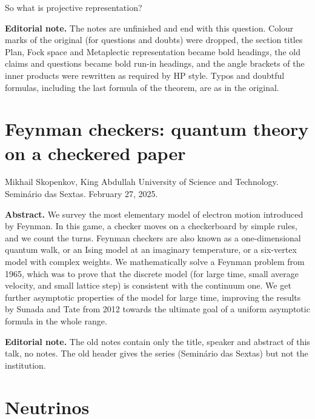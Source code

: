 \medskip{}
So what is projective representation?

\medskip\noindent
{\bf Editorial note.}
The notes are unfinished and end with this
question. Colour marks of the original
(for questions and doubts) were dropped,
the section titles Plan, Fock space and
Metaplectic representation became
bold headings, the old claims and
questions became bold run-in headings,
and the angle brackets of the inner
products were rewritten as required by
HP style. Typos and doubtful formulas,
including the last formula of the
theorem, are as in the original.

\section{Feynman checkers: quantum theory on
a checkered paper}
\label{section-skopenkov-feynman-checkers}

\noindent
Mikhail Skopenkov, King Abdullah University
of Science and Technology.
Semin\'ario das Sextas.
February 27, 2025.

\medskip\noindent
{\bf Abstract.}
We survey the most elementary model of
electron motion introduced by Feynman. In
this game, a checker moves on a checkerboard
by simple rules, and we count the turns.
Feynman checkers are also known as a
one-dimensional quantum walk, or an Ising
model at an imaginary temperature, or a
six-vertex model with complex weights. We
mathematically solve a Feynman problem from
1965, which was to prove that the discrete
model (for large time, small average
velocity, and small lattice step) is
consistent with the continuum one. We get
further asymptotic properties of the model
for large time, improving the results by
Sunada and Tate from 2012 towards the
ultimate goal of a uniform asymptotic formula
in the whole range.

\medskip\noindent
{\bf Editorial note.}
The old notes contain only the title,
speaker and abstract of this talk, no notes.
The old header gives the series
(Seminário das Sextas) but not the
institution.

\section{Neutrinos}
\label{section-neutrinos}

